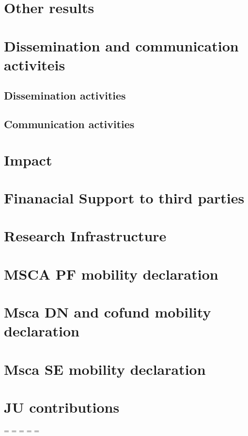 \section{Other results}

\section{Dissemination and communication activiteis}

\subsection{Dissemination activities}

\subsection{Communication activities}

\section{Impact}

\section{Finanacial Support to third parties}

\section{Research Infrastructure}

\section{MSCA PF mobility declaration}

\section{Msca DN and cofund mobility declaration}

\section{Msca SE mobility declaration}

\section{JU contributions}

\endgroup

\newpage
\paperwidth=\pdfpageheight
\paperheight=\pdfpagewidth
\pdfpageheight=\paperheight
\pdfpagewidth=\paperwidth
\headwidth=\textwidth


\color{black}%

\pagestyle{plain} %